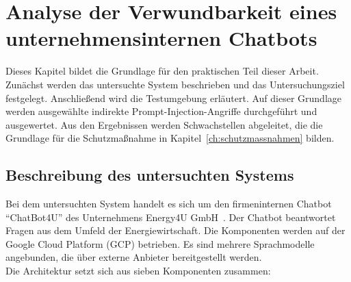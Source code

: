 \chapter{Analyse der Verwundbarkeit eines unternehmensinternen Chatbots}\label{ch:methodik}

Dieses Kapitel bildet die Grundlage für den praktischen Teil dieser Arbeit. Zunächst werden das untersuchte System beschrieben und das Untersuchungsziel festgelegt.
Anschließend wird die Testumgebung erläutert. Auf dieser Grundlage werden ausgewählte indirekte Prompt-Injection-Angriffe durchgeführt und ausgewertet. Aus den
Ergebnissen werden Schwachstellen abgeleitet, die die Grundlage für die Schutzmaßnahme in Kapitel~\ref{ch:schutzmassnahmen} bilden.

\section{Beschreibung des untersuchten Systems}\label{system}

Bei dem untersuchten System handelt es sich um den firmeninternen Chatbot \enquote{ChatBot4U} des Unternehmens Energy4U GmbH~\cite{an17}.
Der Chatbot beantwortet Fragen aus dem Umfeld der Energiewirtschaft. Die Komponenten werden auf der Google Cloud Platform (GCP) betrieben. Es 
sind mehrere Sprachmodelle angebunden, die über externe Anbieter bereitgestellt werden. \\
Die Architektur setzt sich aus sieben Komponenten zusammen:

